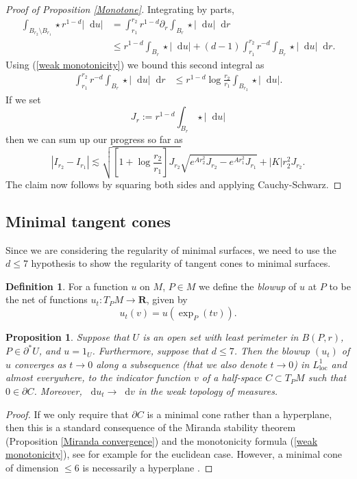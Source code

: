 \documentclass[reqno,11pt]{amsart}
\newcommand{\RR}{\mathbf{R}}
\newcommand*\dif{\mathop{}\!\mathrm{d}}
\newcommand{\dfn}[1]{\emph{#1}\index{#1}}
\newcommand{\loc}{\mathrm{loc}}
\newtheorem{proposition}[theorem]{Proposition}
\theoremstyle{definition}
\newtheorem{definition}[theorem]{Definition}
\numberwithin{equation}{section}
\begin{document}
\begin{proof}[Proof of Proposition \ref{Monotone}]
Integrating by parts,
\begin{align*}
\int_{B_{r_2} \setminus B_{r_1}} \star r^{1 - d} |\dif u| &= \int_{r_1}^{r_2} r^{1 - d} \partial_r \int_{B_r} \star |\dif u| \dif r \\
&\leq r^{1 - d} \int_{B_r} \star |\dif u| + (d - 1) \int_{r_1}^{r_2} r^{-d} \int_{B_r} \star |\dif u| \dif r.
\end{align*}
Using (\ref{weak monotonicity}) we bound this second integral as
\begin{align*}
\int_{r_1}^{r_2} r^{-d} \int_{B_r} \star |\dif u| \dif r &\leq r^{1 - d} \log \frac{r_2}{r_1} \int_{B_{r_2}} \star |\dif u|.
\end{align*}
If we set
$$J_r := r^{1 - d} \int_{B_r} \star |\dif u|$$
then we can sum up our progress so far as
$$|I_{r_2} - I_{r_1}| \lesssim \sqrt{\left[1 + \log \frac{r_2}{r_1}\right] J_{r_2}} \sqrt{e^{Ar_2^2} J_{r_2} - e^{Ar_1^2} J_{r_1}} + |K|r_2^2 J_{r_2}.$$
The claim now follows by squaring both sides and applying Cauchy-Schwarz.
\end{proof}

\subsection{Minimal tangent cones}
Since we are considering the regularity of minimal surfaces, we need to use the $d \leq 7$ hypothesis to show the regularity of tangent cones to minimal surfaces.

\begin{definition}
    For a function $u$ on $M$, $P \in M$ we define the \dfn{blowup} of $u$ at $P$ to be the net of functions $u_t: T_PM \to \RR$, given by
    $$u_t(v) = u\left(\exp_P(tv)\right).$$
\end{definition}

\begin{proposition}\label{blowup theorem}
Suppose that $U$ is an open set with least perimeter in $B(P, r)$, $P \in \partial^* U$, and $u = 1_U$.
Furthermore, suppose that $d \leq 7$.
Then the blowup $(u_t)$ of $u$ converges as $t \to 0$ along a subsequence (that we also denote $t \to 0$) in $L^1_\loc$ and almost everywhere, to the indicator function $v$ of a half-space $C \subset T_PM$ such that $0 \in \partial C$.
Moreover, $\dif u_t \to \dif v$ in the weak topology of measures.
\end{proposition}
\begin{proof}
If we only require that $\partial C$ is a minimal cone rather than a hyperplane, then this is a standard consequence of the Miranda stability theorem (Proposition \ref{Miranda convergence}) and the monotonicity formula (\ref{weak monotonicity}), see for example \cite[Theorem 9.3]{Giusti77} for the euclidean case.
However, a minimal cone of dimension $\leq 6$ is necessarily a hyperplane \cite[Theorem 9.10 and Theorem 10.10]{Giusti77}.
\end{proof}
\end{document}
